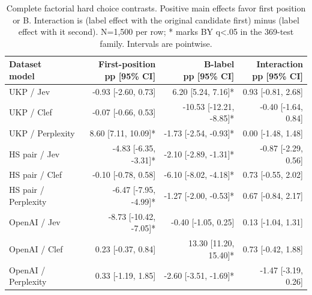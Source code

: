 \begin{table}[t]
\centering\footnotesize
\setlength{\tabcolsep}{3.5pt}
\begin{tabular}{@{}lrrr@{}}
\toprule
\shortstack[l]{Dataset\\{}model} & \shortstack[l]{First-position\\{}pp [95\% CI]} & \shortstack[l]{B-label\\{}pp [95\% CI]} & \shortstack[l]{Interaction\\{}pp [95\% CI]} \\
\midrule
UKP / Jev & -0.93 [-2.60, 0.73] & 6.20 [5.24, 7.16]* & 0.93 [-0.81, 2.68] \\
UKP / Clef & -0.07 [-0.66, 0.53] & -10.53 [-12.21, -8.85]* & -0.40 [-1.64, 0.84] \\
UKP / Perplexity & 8.60 [7.11, 10.09]* & -1.73 [-2.54, -0.93]* & 0.00 [-1.48, 1.48] \\
HS pair / Jev & -4.83 [-6.35, -3.31]* & -2.10 [-2.89, -1.31]* & -0.87 [-2.29, 0.56] \\
HS pair / Clef & -0.10 [-0.78, 0.58] & -6.10 [-8.02, -4.18]* & 0.73 [-0.55, 2.02] \\
HS pair / Perplexity & -6.47 [-7.95, -4.99]* & -1.27 [-2.00, -0.53]* & 0.67 [-0.84, 2.17] \\
OpenAI / Jev & -8.73 [-10.42, -7.05]* & -0.40 [-1.05, 0.25] & 0.13 [-1.04, 1.31] \\
OpenAI / Clef & 0.23 [-0.37, 0.84] & 13.30 [11.20, 15.40]* & 0.73 [-0.42, 1.88] \\
OpenAI / Perplexity & 0.33 [-1.19, 1.85] & -2.60 [-3.51, -1.69]* & -1.47 [-3.19, 0.26] \\
\bottomrule
\end{tabular}
\caption{Complete factorial hard choice contrasts. Positive main effects favor first position or B. Interaction is (label effect with the original candidate first) minus (label effect with it second). N=1,500 per row; * marks BY q<.05 in the 369-test family. Intervals are pointwise.}
\label{tab:appendix_factorial_choice}
\end{table}
